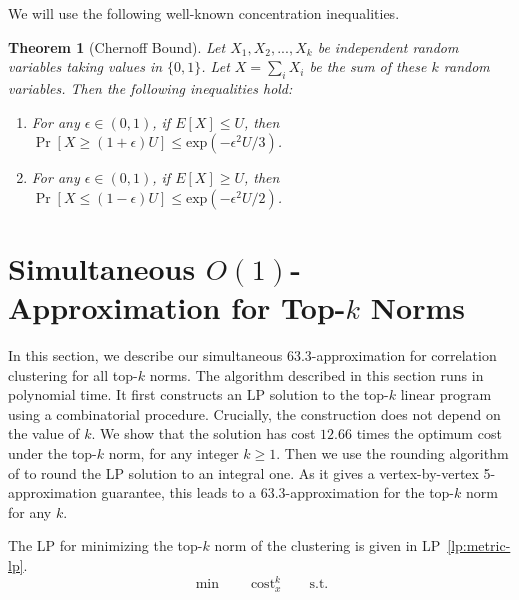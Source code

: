 \documentclass[11pt]{article}
\newcommand{\cost}{\mathrm{cost}}
\newtheorem{theorem}{Theorem}[section]
\begin{document}
\begin{CJK*}{UTF8}{gbsn}
We will use the following well-known concentration inequalities.
\begin{theorem}[Chernoff Bound]
\label{thm:chernoff}
Let $X_1, X_2, ..., X_k$ be independent random variables taking values in $\{0, 1 \}$. Let $X = \sum_{i} X_i$ be the sum of these $k$ random variables. Then the following inequalities hold:
\begin{enumerate}[label=(\ref{thm:chernoff}\alph*)]
    \item For any $\epsilon \in (0, 1)$, if $E[X] \leq U$, then $\Pr[X \geq (1+ \epsilon) U] \leq \mathrm{exp}(-\epsilon^2U/3)$. \label{thm:chernoffgeq}
    \item For any $\epsilon \in (0, 1)$, if $E[X] \geq U$, then $\Pr[X \leq (1 - \epsilon) U] \leq  \mathrm{exp}(-\epsilon^2U/2)$. \label{thm:chernoffleq}
\end{enumerate}
\end{theorem}


 






\section{Simultaneous $O(1)$-Approximation for Top-$k$ Norms}
\label{sec:top-k}
In this section, we describe our simultaneous $63.3$-approximation for correlation clustering for all top-$k$ norms. The algorithm described in this section runs in polynomial time. It first constructs an LP solution to the top-$k$ linear program using a combinatorial procedure. Crucially, the construction does not depend on the value of $k$. We show that the solution has cost $12.66$ times the optimum cost under the top-$k$ norm, for any integer $k \geq 1$. Then we use the rounding algorithm of \cite{kalhan2019correlation} to round the LP solution to an integral one. As it gives a vertex-by-vertex 5-approximation guarantee, this leads to a $63.3$-approximation for the top-$k$ norm for any $k$. 



The LP for minimizing the top-$k$ norm of the clustering is given in LP~\eqref{lp:metric-lp}.
\begin{equation}\label{lp:metric-lp}
    \min \qquad \cost^k_x \qquad \text{s.t.}
\end{equation}\vspace*{-30pt}


\end{CJK*}
\end{document}

